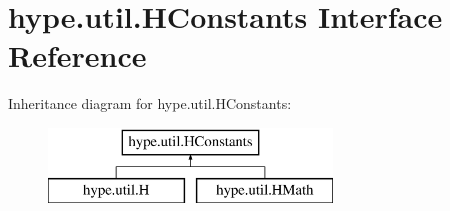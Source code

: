 \hypertarget{interfacehype_1_1util_1_1_h_constants}{\section{hype.\-util.\-H\-Constants Interface Reference}
\label{interfacehype_1_1util_1_1_h_constants}
}
Inheritance diagram for hype.\-util.\-H\-Constants\-:\begin{figure}[H]
\begin{center}
\leavevmode
\includegraphics[height=2.000000cm]{interfacehype_1_1util_1_1_h_constants}
\end{center}
\end{figure}
